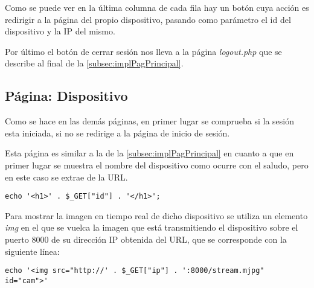 Como se puede ver en la última columna de cada fila hay un botón cuya acción es redirigir a la página del propio dispositivo, pasando como parámetro el id del dispositivo y la IP del mismo.

Por último el botón de cerrar sesión nos lleva a la página \textit{logout.php} que se describe al final de la \autoref{subsec:implPagPrincipal}.

\subsection{Página: Dispositivo}
Como se hace en las demás páginas, en primer lugar se comprueba si la sesión esta iniciada, si no se redirige a la página de inicio de sesión. 

Esta página es similar a la de la \autoref{subsec:implPagPrincipal} en cuanto a que en primer lugar se muestra el nombre del dispositivo como ocurre con el saludo, pero en este caso se extrae de la URL.
\begin{lstlisting}
echo '<h1>' . $_GET["id"] . '</h1>';
\end{lstlisting}

Para mostrar la imagen en tiempo real de dicho dispositivo se utiliza un elemento \textit{img} en el que se vuelca la imagen que está transmitiendo el dispositivo sobre el puerto 8000 de su dirección IP obtenida del URL, que se corresponde con la siguiente línea:
\begin{lstlisting}
echo '<img src="http://' . $_GET["ip"] . ':8000/stream.mjpg" id="cam">'
\end{lstlisting}
\pagebreak

